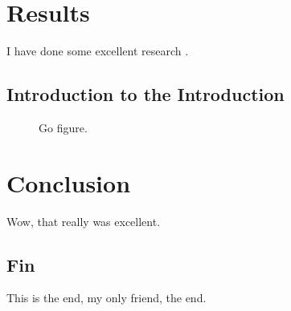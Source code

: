\documentclass[double,12pt]{beavtex}
\begin{document}
\chapter{Results}
I have done some excellent research \cite{matrix}.
\section{Introduction to the Introduction}
\begin{figure}[!ht]
\centering
{}
\caption{Go figure.}
\end{figure}

\chapter{Conclusion}
Wow, that really was excellent.
\section{Fin}
This is the end, my only friend, the end.




\end{document}
